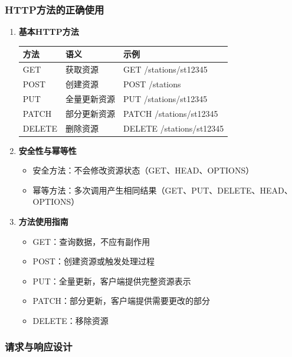 \subsubsection{HTTP方法的正确使用}\label{httpux65b9ux6cd5ux7684ux6b63ux786eux4f7fux7528}

\begin{enumerate}
\def\labelenumi{\arabic{enumi}.}
\item
  \textbf{基本HTTP方法}

  \begin{longtable}[]{@{}lll@{}}
  \toprule\noalign{}
  方法 & 语义 & 示例 \\
  \midrule\noalign{}
  \endhead
  \bottomrule\noalign{}
  \endlastfoot
  GET & 获取资源 & GET /stations/st12345 \\
  POST & 创建资源 & POST /stations \\
  PUT & 全量更新资源 & PUT /stations/st12345 \\
  PATCH & 部分更新资源 & PATCH /stations/st12345 \\
  DELETE & 删除资源 & DELETE /stations/st12345 \\
  \end{longtable}
\item
  \textbf{安全性与幂等性}

  \begin{itemize}
  \tightlist
  \item
    安全方法：不会修改资源状态（GET、HEAD、OPTIONS）
  \item
    幂等方法：多次调用产生相同结果（GET、PUT、DELETE、HEAD、OPTIONS）
  \end{itemize}
\item
  \textbf{方法使用指南}

  \begin{itemize}
  \tightlist
  \item
    GET：查询数据，不应有副作用
  \item
    POST：创建资源或触发处理过程
  \item
    PUT：全量更新，客户端提供完整资源表示
  \item
    PATCH：部分更新，客户端提供需要更改的部分
  \item
    DELETE：移除资源
  \end{itemize}
\end{enumerate}

\subsubsection{请求与响应设计}\label{ux8bf7ux6c42ux4e0eux54cdux5e94ux8bbeux8ba1}

